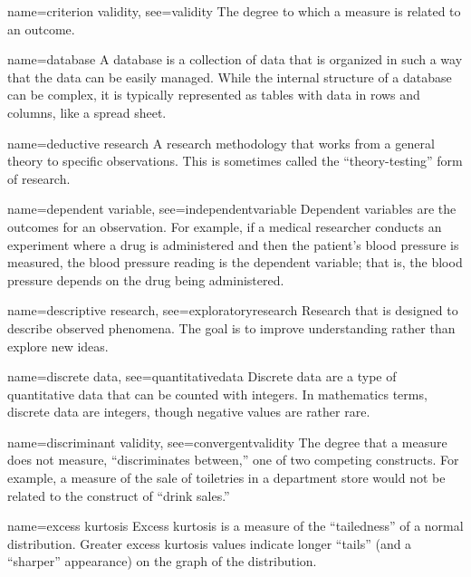 {name={criterion validity},
	see={validity}}
{%
	The degree to which a measure is related to an outcome.  
}

{name={database}}
{%
	A database is a collection of data that is organized in such a way that the data can be easily managed. While the internal structure of a database can be complex, it is typically represented as tables with data in rows and columns, like a spread sheet.
}

{name={deductive research}}
{%
	A research methodology that works from a general theory to specific observations. This is sometimes called the ``theory-testing'' form of research.
}

{name={dependent variable},
	see={independentvariable}}
{%
	Dependent variables are the outcomes for an observation. For example, if a medical researcher conducts an experiment where a drug is administered and then the patient's blood pressure is measured, the blood pressure reading is the dependent variable; that is, the blood pressure depends on the drug being administered.
}

{name={descriptive research},
 see={exploratoryresearch}}
{%
	Research that is designed to describe observed phenomena. The goal is to improve 	understanding rather than explore new ideas.
}

{name={discrete data},
	see={quantitativedata}}
{%
	Discrete data are a type of quantitative data that can be counted with integers. In mathematics terms, discrete data are integers, though negative values are rather rare. 
}

{name={discriminant validity},
	see={convergentvalidity}}
{%
	The degree that a measure does not measure, ``discriminates between,'' one of two competing constructs. For example, a measure of the sale of toiletries in a department store would not be related to the construct of ``drink sales.'' 
}


{name={excess kurtosis}}
{%
	Excess kurtosis is a measure of the ``tailedness'' of a normal distribution. Greater excess kurtosis values indicate longer ``tails'' (and a ``sharper'' appearance) on the graph of the distribution.
}

